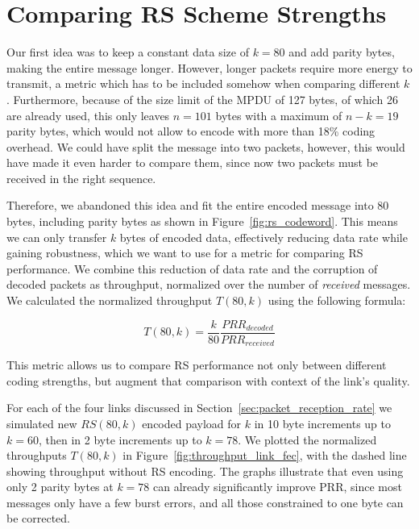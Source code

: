 \section{Comparing \acs{RS} Scheme Strengths}

Our first idea was to keep a constant data size of $k=80$ and add parity bytes, making the entire message longer.
However, longer packets require more energy to transmit, a metric which has to be included somehow when comparing different $k$.
Furthermore, because of the size limit of the \ac{MPDU} of 127 bytes, of which 26 are already used, this only leaves $n=101$ bytes with a maximum of $n-k=19$ parity bytes, which would not allow to encode with more than 18\% coding overhead.
We could have split the message into two packets, however, this would have made it even harder to compare them, since now two packets must be received in the right sequence.

Therefore, we abandoned this idea and fit the entire encoded message into 80 bytes, including parity bytes as shown in Figure~\ref{fig:rs_codeword}.
This means we can only transfer $k$ bytes of encoded data, effectively reducing data rate while gaining robustness, which we want to use for a metric for comparing \ac{RS} performance.
We combine this reduction of data rate and the corruption of decoded packets as throughput, normalized over the number of \emph{received} messages.
We calculated the normalized throughput $T(80, k)$ using the following formula:

\[ T(80, k) = \frac{k}{80} \frac{PRR_{decoded}}{PRR_{received}} \]

This metric allows us to compare \ac{RS} performance not only between different coding strengths, but augment that comparison with context of the link's quality.

For each of the four links discussed in Section~\ref{sec:packet_reception_rate} we simulated new $RS(80, k)$ encoded payload for $k$ in 10 byte increments up to $k=60$, then in 2 byte increments up to $k=78$.
We plotted the normalized throughputs $T(80, k)$ in Figure~\ref{fig:throughput_link_fec}, with the dashed line showing throughput without RS encoding.
The graphs illustrate that even using only 2 parity bytes at $k=78$ can already significantly improve \ac{PRR}, since most messages only have a few burst errors, and all those constrained to one byte can be corrected.

